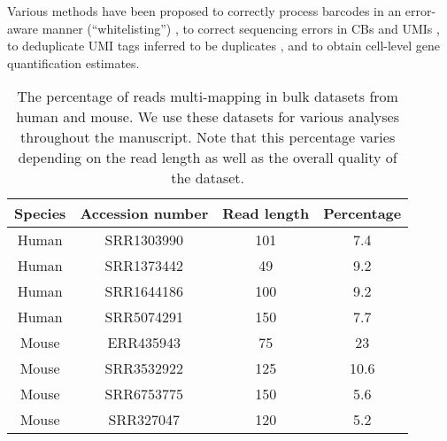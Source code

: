 Various methods have been proposed to correctly process \dscrnaseq barcodes in an error-aware manner (``whitelisting'') \cite{bartender, sircel, tenx, dropest, umitools}, to correct sequencing errors in CBs and UMIs \cite{dropest, umitools}, to deduplicate UMI tags inferred to be duplicates \cite{umitools}, and to obtain cell-level gene quantification estimates\citep{scpipe}. 

\begin{table}[!htb]
\centering
\caption{The percentage of reads multi-mapping in bulk datasets from human and mouse. We use these datasets for various analyses throughout the manuscript. Note that this percentage varies depending on the read length as well as the overall quality of the dataset.}
      \begin{tabular}{cccc}
        \hline
           Species & Accession number & Read length & Percentage \\ \hline
    Human & SRR1303990\citep{poldrack2015long} & 101 & 7.4 \\
    Human & SRR1373442\citep{dvinge2014sample} & 49 & 9.2 \\
    Human & SRR1644186\citep{bouquet2016longitudinal} & 100 & 9.2 \\
    Human & SRR5074291\citep{shen2017screening} & 150 & 7.7 \\
    Mouse & ERR435943\citep{schmitt2014high} & 75 & 23 \\
    Mouse & SRR3532922\citep{saito2016nova2} & 125 & 10.6 \\
    Mouse & SRR6753775\citep{fratta2018mice} & 150 & 5.6 \\
    Mouse & SRR327047\citep{mouse_retina} & 120 & 5.2 \\ \hline
      \end{tabular}
      \label{suptab:bulkmmRate}
\end{table}

